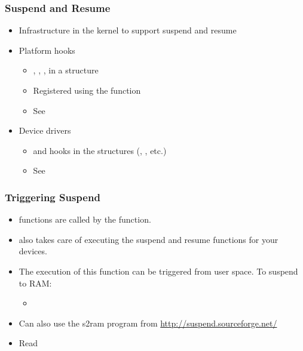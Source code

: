 \begin{frame}
  \frametitle{Suspend and Resume}
  \begin{itemize}
  \item Infrastructure in the kernel to support suspend and resume
  \item Platform hooks
    \begin{itemize}
    \item {}, , ,
       in a  structure
    \item Registered using the  function
    \item See 
    \end{itemize}
  \item Device drivers
    \begin{itemize}
    \item {} and  hooks in the
       structures (,
      , etc.)
    \item See 
    \end{itemize}
  \end{itemize}
\end{frame}

\begin{frame}
  \frametitle{Triggering Suspend}
  \begin{itemize}
  \item {} functions are called by the
     function.
  \item {} also takes care of executing the suspend
    and resume functions for your devices.
  \item The execution of this function can be triggered from
    user space. To suspend to RAM:
    \begin{itemize}
    \item {}
    \end{itemize}
  \item Can also use the s2ram program from
    \url{http://suspend.sourceforge.net/}
  \item Read 
  \end{itemize}
\end{frame}

